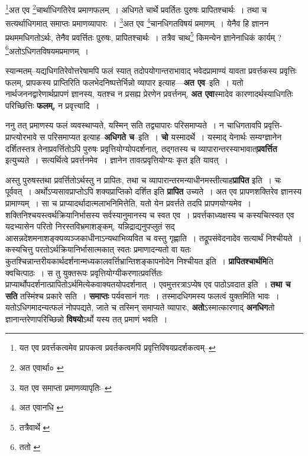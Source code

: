 \documentclass[article,12pt,a4paper]{memoir}
\begin{document}
	  \pstart \footnote{यत एव प्रवर्त्तकत्वमेव प्रापकत्व प्रवर्तकत्वमपि प्रवृत्तिविषयप्रदर्शकत्वम्--\cite{dp-msD-n}}अत एव \footnote{अत एवार्था० \cite{dp-msB}}चार्थाधिगतिरेव प्रमाणफलम् । अधिगते चार्थे प्रवर्तितः पुरुषः प्रापितश्चार्थः । तथा च सत्यर्थाधिगमात् समाप्तः प्रमाणव्यापारः । \footnote{यत एव समाप्ता प्रमाणव्यापृतिः--\cite{dp-msD-n}}अत एव \footnote{अत एवानधि \cite{dp-msA} \cite{dp-edP} \cite{dp-edH} \cite{dp-edE} \cite{dp-edN}}चानधिगतविषयं प्रमाणम् । येनैव हि ज्ञानन प्रथममधिगतोऽर्थः, तेनैव प्रवर्त्तितः पुरुषः, प्रापितश्चार्थः । तत्रैव चाथ\footnote{तत्रैवार्थे \cite{dp-msA} \cite{dp-edP} \cite{dp-edE} \cite{dp-edH} \cite{dp-edN}} किमन्येन ज्ञानेनाधिकं कार्यम् ? \footnote{ततो \cite{dp-msA} \cite{dp-msB} \cite{dp-msC} \cite{dp-msD} \cite{dp-edP} \cite{dp-edH} \cite{dp-edE} \cite{dp-edN}}अतोऽधिगतविषयमप्रमाणम् ।
	\pend
      
	  \endgroup
	

	  \pstart स्यान्मतम्--यद्यधिगतिरेवोत्तरेषामपि फलं स्यात् तदोपयोगान्तराभावाद् भवेदप्रामाण्यं यावता प्रवर्त्तकस्य प्रवृत्तिः फलम्, प्रापकस्य प्राप्तिरिति फलभेदनिष्पत्तेर्भिन्नो व्यापार इत्याह—\textbf{अत एव}--इति । यतो नार्थजननद्वारेणार्थप्रापणं ज्ञानस्य, यतश्च न प्रसह्य प्रेरणेन प्रवर्त्तनम्, \textbf{अत एवा}स्मादेव कारणादर्थस्याधिगतिः परिच्छित्तिः \textbf{फलम्,} न प्रवृत्त्यादि ।
	\pend
      

	  \pstart ननु तत् प्रमाणस्य फलं व्यवस्थाप्यते, यस्मिन् सति तद्व्यापारः परिसमाप्यते । न चाधिगतावपि प्रवृत्ति-प्राप्त्योरभावे स परिसमाप्यत इत्याह--\textbf{अधिगते च}--इति । \textbf{चो} यस्मादर्थे । यस्माद् येनार्थः सम्यग्ज्ञानेन दर्शितस्तत्र तेनाप्रवर्त्तितोऽपि पुरुषः प्रवृत्तियोग्योपदर्शनात्, तद्गतस्य च व्यापारान्तरस्याभावात्\textbf{प्रवर्त्तित} इत्युच्यते । सत्यर्थित्वे प्रवर्त्तनमेव । ज्ञानेन तावत्प्रवृत्तियोग्यः कृत इति यावत् ।
	\pend
      

	  \pstart अस्तु पुरुषस्तथा प्रवर्त्तितोऽर्थस्तु न प्रापितः, तथा च व्यापारान्तरमन्याधीनमस्तीत्याह\textbf{प्रापित} इति । चः पूर्ववत् । अर्थोऽप्यसावप्राप्तोऽपि शक्यप्राप्तिको दर्शित इति \textbf{प्रापित} उच्यते । अत एव प्रापणशक्तिरेव ज्ञानस्य प्रामाण्यम् । सा च प्राप्यादर्थादात्मलाभनिमित्तेति, यतो \leavevmode{} येन प्रवर्त्तते तदपि प्रापणयोग्यमेव । शक्तिनिश्चयस्त्वर्थक्रियानिर्भासस्य सर्वस्यानुमानस्य च स्वत एव । प्रवर्त्तकाध्यक्षस्य च कस्यचित्स्वत एव यदभ्यासेन परितो निरस्तविभ्रमाशङ्कम्, यन्निद्राद्यनुपप्लुतं सद् आसन्नदेशमनाशङ्क्यव्यञ्जकाधीनाऽन्यथाभिव्यवित च वस्तु गृह्णाति । तद्रूपसंवेदनादेव सत्यार्थं निश्चीयते । कस्यचित्तु परतोऽर्थक्रियानिर्भासात्मकात् स्वतः प्रमाणादन्यतो वा यतः कुतश्चिन्नान्तरीयकार्थदर्शनान्मध्यकालवर्त्तिभ्रान्तिशङ्कापनोदेन निश्चीयत इति । \textbf{प्रापितश्चार्थमि}ति क्वचित्पाठः । स तु युक्तरूपः प्रवृत्तियोग्यीकरणात्प्रवर्त्तितः प्राप्यार्थोपदर्शनात्प्रापितोऽर्थमित्येकवाक्यतयोपदर्शनात् । एवमुत्तरत्राऽप्येष एव पाठोऽवदात इति । \textbf{तथा च सति} तस्मिंश्च प्रकारे सति । \textbf{समाप्तः} पर्यवसानं गतः । तस्मादधिगमस्य फलत्वं युक्तमिति भावः । यतोऽधिगमादन्यत्फलं नोपपद्यते, जाते च तस्मिन् समाप्यते व्यापारः, \textbf{अतो}ऽस्मात्कारणाद् \textbf{अनधिग}तो ज्ञानान्तरेणापरिच्छिन्नो \textbf{विषयो}ऽर्थो यस्य तत् प्रमाणं भवति ।
	\pend
      
\end{document}
